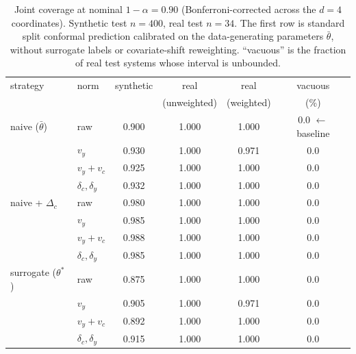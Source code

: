 \begin{table}[t]
\centering
\small
\begin{tabular}{llcccc}
\toprule
strategy & norm & synthetic & real & real & vacuous \\
         &      &           & (unweighted) & (weighted) & (\%) \\
\midrule
naive ($\bar\theta$) & raw & 0.900 & 1.000 & 1.000 & 0.0  \quad$\leftarrow$ baseline \\
 & $v_y$ & 0.930 & 1.000 & 0.971 & 0.0 \\
 & $v_y + v_c$ & 0.925 & 1.000 & 1.000 & 0.0 \\
 & $\delta_c,\delta_y$ & 0.932 & 1.000 & 1.000 & 0.0 \\
\midrule
naive + $\Delta_c$ & raw & 0.980 & 1.000 & 1.000 & 0.0 \\
 & $v_y$ & 0.985 & 1.000 & 1.000 & 0.0 \\
 & $v_y + v_c$ & 0.988 & 1.000 & 1.000 & 0.0 \\
 & $\delta_c,\delta_y$ & 0.985 & 1.000 & 1.000 & 0.0 \\
\midrule
surrogate ($\theta^*$) & raw & 0.875 & 1.000 & 1.000 & 0.0 \\
 & $v_y$ & 0.905 & 1.000 & 0.971 & 0.0 \\
 & $v_y + v_c$ & 0.892 & 1.000 & 1.000 & 0.0 \\
 & $\delta_c,\delta_y$ & 0.915 & 1.000 & 1.000 & 0.0 \\
\bottomrule
\end{tabular}
\caption{Joint coverage at nominal $1-\alpha = 0.90$ (Bonferroni-corrected across the $d=4$ coordinates). Synthetic test $n=400$, real test $n=34$. The first row is standard split conformal prediction calibrated on the data-generating parameters $\bar\theta$, without surrogate labels or covariate-shift reweighting. ``vacuous'' is the fraction of real test systems whose interval is unbounded.}
\label{tab:cp-ablation}
\end{table}
